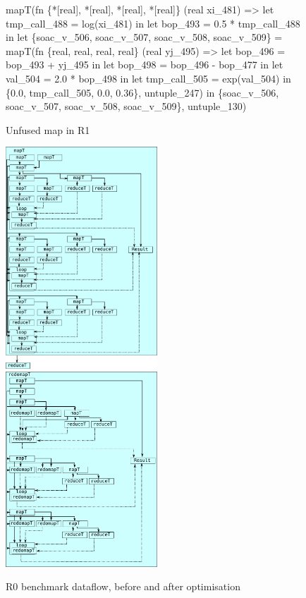 \begin{figure}
\begin{center}
\begin{bcolorcode}
mapT(fn \{*[real], *[real], *[real], *[real]\} (real xi_481) =>
       let tmp_call_488 = log(xi_481) in
       let bop_493 = 0.5 * tmp_call_488 in
       let \{soac_v_506, soac_v_507, soac_v_508, soac_v_509\} =
         mapT(fn \{real, real, real, real\} (real yj_495) =>
                let bop_496 = bop_493 + yj_495 in
                let bop_498 = bop_496 - bop_477 in
                let val_504 = 2.0 * bop_498 in
                let tmp_call_505 = exp(val_504) in
                \{0.0, tmp_call_505, 0.0, 0.36\},
              untuple_247) in
       \{soac_v_506, soac_v_507, soac_v_508, soac_v_509\},
     untuple_130)
\end{bcolorcode}
\end{center}
\caption{Unfused map in R1}
\label{fig:r1-unfused-map}
\end{figure}

\begin{figure}
\begin{center}
\includegraphics[width=5.7cm,valign=t]{img/CalibLexiFi-unfused.pdf}
\hspace{0.2cm}
\includegraphics[width=5.7cm,valign=t]{img/CalibLexiFi-fused.pdf}
\end{center}
\caption{R0 benchmark dataflow, before and after optimisation}
\label{fig:r2-dataflow}
\end{figure}

